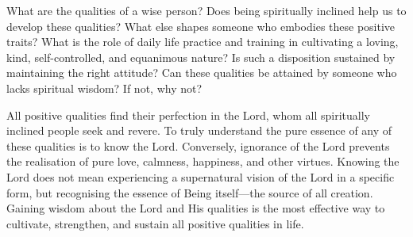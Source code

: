 \newpage
\begin{mananam}{}
\normalfont\mananamtext What are the qualities of a wise person? Does being spiritually inclined help us to develop these qualities? What else shapes someone who embodies these positive traits? 
What is the role of daily life practice and training in cultivating a loving, kind, self-controlled, and equanimous nature? Is such a disposition sustained by maintaining the right attitude? Can these qualities be attained by someone who lacks spiritual wisdom? If not, why not?
\end{mananam}
\sreflect
\begin{inspiration}{}
\normalfont\mananamtext All positive qualities find their perfection in the Lord, whom all spiritually inclined people seek and revere. To truly understand the pure essence of any of these qualities is to know the Lord. Conversely, ignorance of the Lord prevents the realisation of pure love, calmness, happiness, and other virtues. Knowing the Lord does not mean experiencing a supernatural vision of the Lord in a specific form, but recognising the essence of Being itself—the source of all creation. Gaining wisdom about the Lord and His qualities is the most effective way to cultivate, strengthen, and sustain all positive qualities in life.
\end{inspiration}
\newpage

